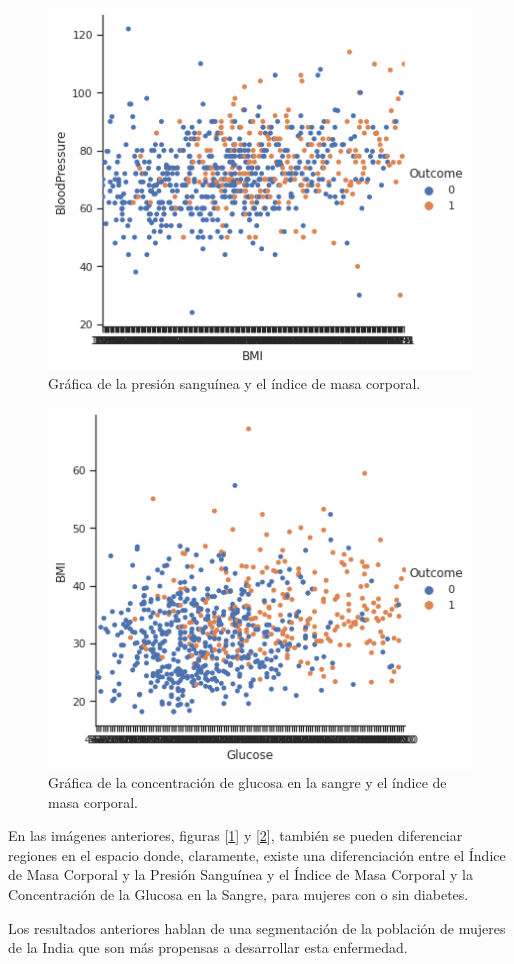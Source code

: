 \documentclass{article}
\begin{document}
\begin{figure}[H]
	\centering
	\includegraphics[width=0.65\linewidth]{BloodPressure_BMI.png}
	\caption{Gráfica de la presión sanguínea y el índice de masa corporal.}%
	\label{fig:BloodPressure_BMI}
\end{figure}

\begin{figure}[H]
	\centering
	\includegraphics[width=0.65\linewidth]{BMI_Glucose.png}
	\caption{Gráfica de la concentración de glucosa en la sangre y el índice de masa corporal.}%
	\label{fig:BMI_Glucose}
\end{figure}

En las imágenes anteriores, figuras [\ref{fig:BloodPressure_BMI}] y [\ref{fig:BMI_Glucose}], también se pueden diferenciar regiones en el espacio donde, claramente, existe una diferenciación entre el Índice de Masa Corporal y la Presión Sanguínea y el Índice de Masa Corporal y la Concentración de la Glucosa en la Sangre, para mujeres con o sin diabetes.

Los resultados anteriores hablan de una segmentación de la población de mujeres de la India que son más propensas a desarrollar esta enfermedad.
\end{document}
